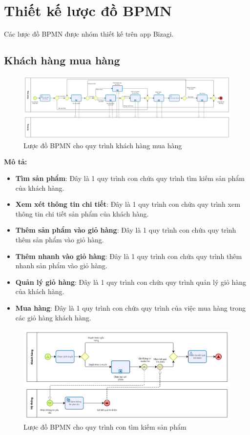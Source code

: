 \section{Thiết kế lược đồ BPMN}

Các lược đồ BPMN được nhóm thiết kế trên app Bizagi.
\subsection{Khách hàng mua hàng}
    \begin{figure}[!htp]
        \centering
        \includegraphics[width=17cm]{img/BPMN/customer_buy/customer_buy.png}
        \newline
        \caption{Lược đồ BPMN cho quy trình khách hàng mua hàng}
    \end{figure}
    \textbf{Mô tả:}
    \begin{itemize}
        \item \textbf{Tìm sản phẩm}: Đây là 1 quy trình con chứa quy trình tìm kiếm sản phẩm của  khách hàng.
        \item \textbf{Xem xét thông tin chi tiết}: Đây là 1 quy trình con chứa quy trình xem thông tin chi tiết sản phẩm của  khách hàng.
        \item \textbf{Thêm sản phẩm vào giỏ hàng}: Đây là 1 quy trình con chứa quy trình thêm sản phẩm vào giỏ hàng.
        \item \textbf{Thêm nhanh vào giỏ hàng}: Đây là 1 quy trình con chứa quy trình thêm nhanh sản phẩm vào giỏ hàng.
        \item \textbf{Quản lý giỏ hàng}: Đây là 1 quy trình con chứa quy trình quản lý giỏ hàng của khách hàng.
        \item \textbf{Mua hàng}: Đây là 1 quy trình con chứa quy trình của việc mua hàng trong các giỏ hàng khách hàng.
    \end{itemize}
    \begin{figure}[!htp]
        \centering
        \includegraphics[width=13cm]{img/BPMN/customer_buy/customer_search_product.png}
        \newline
        \caption{Lược đồ BPMN cho quy trình con tìm kiếm sản phẩm}
    \end{figure}
